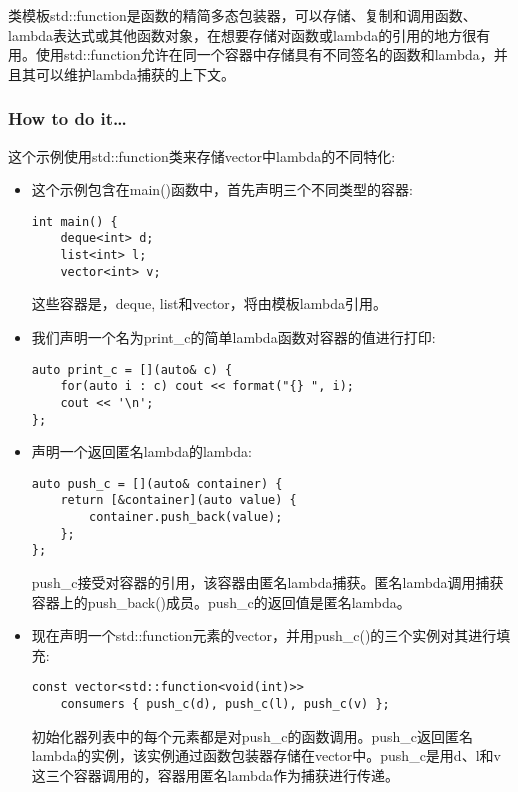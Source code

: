 
类模板std::function是函数的精简多态包装器，可以存储、复制和调用函数、lambda表达式或其他函数对象，在想要存储对函数或lambda的引用的地方很有用。使用std::function允许在同一个容器中存储具有不同签名的函数和lambda，并且其可以维护lambda捕获的上下文。

\subsubsection{How to do it…}

这个示例使用std::function类来存储vector中lambda的不同特化:

\begin{itemize}
\item 
这个示例包含在main()函数中，首先声明三个不同类型的容器:

\begin{lstlisting}[style=styleCXX]
int main() {
	deque<int> d;
	list<int> l;
	vector<int> v;
\end{lstlisting}

这些容器是，deque, list和vector，将由模板lambda引用。

\item 
我们声明一个名为print\_c的简单lambda函数对容器的值进行打印:

\begin{lstlisting}[style=styleCXX]
auto print_c = [](auto& c) {
	for(auto i : c) cout << format("{} ", i);
	cout << '\n';
};
\end{lstlisting}

\item 
声明一个返回匿名lambda的lambda:

\begin{lstlisting}[style=styleCXX]
auto push_c = [](auto& container) {
	return [&container](auto value) {
		container.push_back(value);
	};
};
\end{lstlisting}

push\_c接受对容器的引用，该容器由匿名lambda捕获。匿名lambda调用捕获容器上的push\_back()成员。push\_c的返回值是匿名lambda。

\item 
现在声明一个std::function元素的vector，并用push\_c()的三个实例对其进行填充:

\begin{lstlisting}[style=styleCXX]
const vector<std::function<void(int)>>
	consumers { push_c(d), push_c(l), push_c(v) };
\end{lstlisting}

初始化器列表中的每个元素都是对push\_c的函数调用。push\_c返回匿名lambda的实例，该实例通过函数包装器存储在vector中。push\_c是用d、l和v这三个容器调用的，容器用匿名lambda作为捕获进行传递。


\end{itemize}
